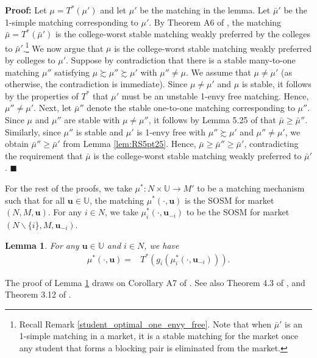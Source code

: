 \documentclass[12pt, fullpage]{amsart}
\newtheorem{lemma}{Lemma}[section]
\theoremstyle{definition}
\theoremstyle{definition}
\theoremstyle{definition}
\begin{document}
\begin{bibunit}[econometrica]
\noindent \textbf{Proof: } Let $\mu = T^{*}(\mu')$ and let $\mu'$ be the matching in the lemma. Let $\bar \mu'$ be the 1-simple matching corresponding to $\mu'$. By Theorem A6 of \citet{Blum/Rothblum/2002}, the matching $\bar{\mu}=T^{*}(\bar{\mu}')$ is the college-worst stable matching weakly preferred by the colleges to $\bar{\mu}'$.\footnote{Recall Remark \ref{student_optimal_one_envy_free}. Note that when $\bar \mu'$ is an 1-simple matching in a market, it is a stable matching for the market once any student that forms a blocking pair is eliminated from the market.} We now argue that $\mu$ is the college-worst stable matching weakly preferred by colleges to $\mu'$.  
Suppose by contradiction that there is a stable many-to-one matching $\mu''$ satisfying $\mu\succsim\mu''\succsim\mu'$ with $\mu''\neq\mu$. We assume that $\mu\ne \mu'$ (as otherwise, the contradiction is immediate).  Since $\mu\ne \mu'$ and $\mu$ is stable, it follows by the properties of $T^{*}$ that $\mu'$ must be an unstable 1-envy free matching. Hence, $\mu'' \ne \mu'$. Next, let $\bar{\mu}''$ denote the stable one-to-one matching corresponding to $\mu''$. Since $\mu$ and $\mu''$ are stable with $\mu \neq \mu''$, it follows by Lemma 5.25 of \cite{Roth/Sotomayor:90:TwoSidedMatching} that $\bar{\mu}\geq\bar{\mu}''$.  Similarly, since $\mu''$ is stable and  $\mu'$ is 1-envy free with  $\mu''\succsim\mu'$ and $\mu''\neq \mu'$, we obtain $\bar{\mu}''\geq\bar{\mu}'$ from Lemma \ref{lem:RS5pt25}.    Hence, $\bar{\mu}\geq\bar{\mu}''\geq\bar{\mu}'$, contradicting the requirement that $\bar{\mu}$ is the college-worst stable matching weakly preferred to $\bar{\mu}'$.  $\blacksquare$\medskip

For the rest of the proofs, we take $\mu^{*}: N \times \mathbb{U} \rightarrow M'$ to be a matching mechanism such that for all $\boldsymbol{u} \in \mathbb{U}$, the matching $\mu^{*}(\cdot, \boldsymbol{u})$ is the SOSM for market $(N,M,\boldsymbol{u})$. For any $i \in N$, we take $\mu_{i}^*(\cdot,\boldsymbol{u}_{-i})$ to be the SOSM for market $(N\backslash\{i\},M,\boldsymbol{u}_{-i})$.

\begin{lemma} \label{lemm:equilibration_theorem} For any $\boldsymbol{u}\in\mathbb{U}$ and $i\in N$, we have
	\begin{align*}
		\mu^{*}(\cdot,\boldsymbol{u})= & T^*(g_i(\mu_i^*(\cdot,\boldsymbol{u}_{-i}))).
	\end{align*}
\end{lemma}

The proof of Lemma \ref{lemm:equilibration_theorem} draws on Corollary A7 of \citet{Blum/Rothblum/2002}. See
also Theorem 4.3 of \cite{Blum/Roth/Rothblum:1997:JET}, and Theorem 3.12 of \cite{Wu/Roth:2018:GEB}.\medskip


\end{bibunit}
\end{document}
